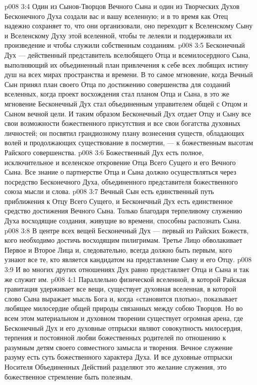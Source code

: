 \vs p008 3:4 Один из Сынов\hyp{}Творцов Вечного Сына и один из Творческих Духов Бесконечного Духа создали вас и вашу вселенную; и в то время как Отец надежно сохраняет то, что они организовали, оно переходит к Вселенскому Сыну и Вселенскому Духу этой вселенной, чтобы те лелеяли и поддерживали их произведение и чтобы служили собственным созданиям.
\vs p008 3:5 \pc Бесконечный Дух --- действенный представитель вселюбящего Отца и всемилосердного Сына, выполняющий их объединенный план привлечения к себе всех любящих истину душ на всех мирах пространства и времени. В то самое мгновение, когда Вечный Сын принял план своего Отца по достижению совершенства для созданий вселенных, когда проект восхождения стал планом Отца и Сына, в это же мгновение Бесконечный Дух стал объединенным управителем общей с Отцом и Сыном вечной цели. И таким образом Бесконечный Дух отдает Отцу и Сыну все свои возможности божественного присутствия и все свои богатства духовных личностей; он посвятил  грандиозному плану вознесения существ, обладающих волей и продолжающих существование в посмертии, --- к божественным высотам Райского совершенства.
\vs p008 3:6 Божественный Дух есть полное, исключительное и вселенское откровение Отца Всего Сущего и его Вечного Сына. Все знание о партнерстве Отца и Сына должно осуществляться через посредство Бесконечного Духа, объединенного представителя божественного союза мысли и слова.
\vs p008 3:7 Вечный Сын есть единственный путь приближения к Отцу Всего Сущего, и Бесконечный Дух есть единственное средство достижения Вечного Сына. Только благодаря терпеливому служению Духа восходящие создания, живущие во времени, способны распознать Сына.
\vs p008 3:8 В центре всех вещей Бесконечный Дух --- первый из Райских Божеств, кого необходимо достичь восходящим пилигримам. Третье Лицо обволакивает Первое и Второе Лица и, следовательно, всегда должно быть первым, кого узнают все те, кто является кандидатом на представление Сыну и его Отцу.
\vs p008 3:9 И во многих других отношениях Дух равно представляет Отца и Сына и так же служит им.
\vs p008 4:1 Параллельно физической вселенной, в которой Райская гравитация удерживает все вещи, существует духовная вселенная, в которой слово Сына выражает мысль Бога и, когда «становится плотью», показывает любящее милосердие общей природы связанных между собою Творцов. Но во всем этом материальном и духовном творении существует огромная арена, где Бесконечный Дух и его духовные отпрыски являют совокупность милосердия, терпения и постоянной любви божественных родителей по отношению к разумным детям своего совместного замысла и творения. Вечное служение разуму есть суть божественного характера Духа. И все духовные отпрыски Носителя Объединенных Действий разделяют это желание служения, это божественное стремление быть полезным.
